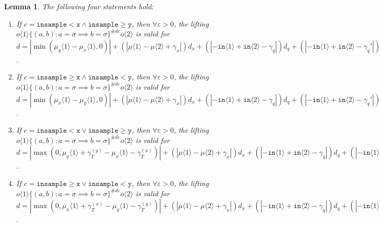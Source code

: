 \documentclass[12pt]{article}
\newcommand{\gguard}[1][x]{\texttt{insample}\geq#1}
\newcommand{\lguard}[1][x]{\texttt{insample} < #1}
\newcommand{\brangle}[1]{\langle#1 \rangle}
\newtheorem{lemma}[thm]{Lemma}
\theoremstyle{definition}
\begin{document}
\begin{lemma}
    The following four statements hold:\begin{enumerate}
        \item If $c = \lguard[\texttt{x}] \land \gguard[\texttt{y}]$, then $\forall \varepsilon>0$, the lifting $o\brangle{1}\{(a, b): a=\sigma\implies b=\sigma\}^{\#d\varepsilon}o\brangle{2}$ is valid for $d = |\min(\mu_y\brangle{1}-\mu_x\brangle{1}, 0)|+(|\mu\brangle{1}-\mu\brangle{2}+\gamma_x|)d_x+(|-\texttt{in}\brangle{1}+\texttt{in}\brangle{2}-\gamma_q|)d_q+(|-\texttt{in}\brangle{1}+\texttt{in}\brangle{2}-\gamma_q'|)d_q'$. 
        \item If $c = \gguard[\texttt{x}] \land \lguard[\texttt{y}]$, then $\forall \varepsilon>0$, the lifting $o\brangle{1}\{(a, b): a=\sigma\implies b=\sigma\}^{\#d\varepsilon}o\brangle{2}$ is valid for $d = |\min(\mu_x\brangle{1}-\mu_y\brangle{1}, 0)|+(|\mu\brangle{1}-\mu\brangle{2}+\gamma_x|)d_x+(|-\texttt{in}\brangle{1}+\texttt{in}\brangle{2}-\gamma_q|)d_q+(|-\texttt{in}\brangle{1}+\texttt{in}\brangle{2}-\gamma_q'|)d_q'$. 
        \item If $c = \lguard[\texttt{x}] \lor \gguard[\texttt{y}]$, then $\forall \varepsilon>0$, the lifting $o\brangle{1}\{(a, b): a=\sigma\implies b=\sigma\}^{\#d\varepsilon}o\brangle{2}$ is valid for $d = |\max(0, \mu_y\brangle{1}+ \gamma_T^{(y)}-\mu_x\brangle{1}-\gamma_T^{(x)})|+(|\mu\brangle{1}-\mu\brangle{2}+\gamma_x|)d_x+(|-\texttt{in}\brangle{1}+\texttt{in}\brangle{2}-\gamma_q|)d_q+(|-\texttt{in}\brangle{1}+\texttt{in}\brangle{2}-\gamma_q'|)d_q'$. 
        \item If $c = \gguard[\texttt{x}] \lor \lguard[\texttt{y}]$, then $\forall \varepsilon>0$, the lifting $o\brangle{1}\{(a, b): a=\sigma\implies b=\sigma\}^{\#d\varepsilon}o\brangle{2}$ is valid for $d = |\max(0, \mu_x\brangle{1}+ \gamma_T^{(x)}-\mu_y\brangle{1}-\gamma_T^{(y)})|+(|\mu\brangle{1}-\mu\brangle{2}+\gamma_x|)d_x+(|-\texttt{in}\brangle{1}+\texttt{in}\brangle{2}-\gamma_q|)d_q+(|-\texttt{in}\brangle{1}+\texttt{in}\brangle{2}-\gamma_q'|)d_q'$. 
    \end{enumerate}
\end{lemma}
\end{document}

